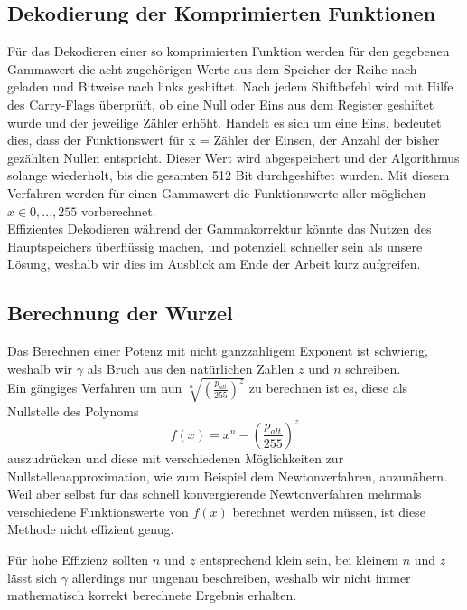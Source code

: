 \documentclass[course=erap]{aspdoc}
\begin{document}
	\subsection{Dekodierung der Komprimierten Funktionen}
	Für das Dekodieren einer so komprimierten Funktion werden für den gegebenen Gammawert die acht zugehörigen Werte aus dem Speicher der Reihe nach geladen und Bitweise nach links geshiftet. Nach jedem Shiftbefehl wird mit Hilfe des Carry-Flags überprüft, ob eine Null oder Eins aus dem Register geshiftet wurde und der jeweilige Zähler erhöht. Handelt es sich um eine Eins, bedeutet dies, dass der Funktionswert für x = Zähler der Einsen, der Anzahl der bisher gezählten Nullen entspricht. Dieser Wert wird abgespeichert und der Algorithmus solange wiederholt, bis die gesamten 512 Bit durchgeshiftet wurden. Mit diesem Verfahren werden für einen Gammawert die Funktionswerte aller möglichen $x\in{0,...,255}$ vorberechnet.\\
	Effizientes Dekodieren während der Gammakorrektur könnte das Nutzen des Hauptspeichers überflüssig machen, und potenziell schneller sein als unsere Lösung, weshalb wir dies im Ausblick am Ende der Arbeit kurz aufgreifen.

	\subsection{Berechnung der Wurzel}
	Das Berechnen einer Potenz mit nicht ganzzahligem Exponent ist schwierig, weshalb wir $\gamma$ als Bruch aus den natürlichen Zahlen $z$ und $n$ schreiben.\\

	\noindent Ein gängiges Verfahren um nun $\sqrt[n]{\left(\frac{p_{alt}}{255}\right)^{z}}$ zu berechnen ist es, diese als Nullstelle des Polynoms
	\begin{equation}
	f(x) = {x}^{n} - \left(\frac{p_{alt}}{255}\right)^{z}
	\end{equation}
	 auszudrücken und diese mit verschiedenen Möglichkeiten zur Nullstellenapproximation, wie zum Beispiel dem Newtonverfahren, anzunähern. Weil aber selbst für das schnell konvergierende Newtonverfahren mehrmals verschiedene Funktionswerte von $f(x)$ berechnet werden müssen, ist diese Methode nicht effizient genug.

	Für hohe Effizienz sollten $n$ und $z$ entsprechend klein sein, bei kleinem $n$ und $z$ lässt sich $\gamma$ allerdings nur ungenau beschreiben, weshalb wir nicht immer mathematisch korrekt berechnete Ergebnis erhalten.
\end{document}
